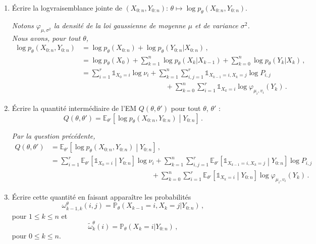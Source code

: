 \documentclass[a4paper,10pt,fleqn]{article}
\newcommand{\1}{\ensuremath{\mathbbm{1}}}
\begin{document}
\begin{enumerate}
\item \'Ecrire la logvraisemblance jointe de $(X_{0:n},Y_{0:n})$: $\theta \mapsto \log p_\theta (X_{0:n},Y_{0:n})$.

\vspace{.2cm}

{\em
Notons $\varphi_{\mu,\sigma^2}$ la densit\'e de la loi gaussienne de moyenne $\mu$ et de variance $\sigma^2$. Nous avons, pour tout $\theta$,
\begin{align*}
\log p_\theta (X_{0:n},Y_{0:n}) &= \log p_\theta (X_{0:n}) + \log p_\theta (Y_{0:n}|X_{0:n})\,,\\
&= \log p_\theta (X_{0}) + \sum_{k=1}^n\log p_\theta (X_{k}|X_{k-1})+ \sum_{k=0}^n\log p_\theta(Y_k|X_k)\,,\\
&= \sum_{i=1}^r\mathds{1}_{X_0=i}\log \nu_i + \sum_{k=1}^n\sum_{i,j=1}^r\mathds{1}_{X_{k-1}=i,X_k=j} \log P_{i,j} \\
&\hspace{5cm}+ \sum_{k=0}^n\sum_{i=1}^r\mathds{1}_{X_k=i}\log \varphi_{\mu_i,v_i}(Y_{k})\,.
\end{align*}
}
\item \'Ecrire la quantit\'e interm\'ediaire de l'EM $Q(\theta,\theta')$ pour tout $\theta$, $\theta'$ :
$$
Q(\theta,\theta') = \mathbb{E}_{\theta'}\left[\log p_\theta (X_{0:n},Y_{0:n})\middle |Y_{0:n}\right]\,.
$$

\vspace{.2cm}

{\em
Par la question pr\'ec\'edente, 
\begin{align*}
Q(\theta,\theta') &= \mathbb{E}_{\theta'}\left[\log p_\theta (X_{0:n},Y_{0:n})\middle |Y_{0:n}\right]\,,\\
&=\sum_{i=1}^r\mathbb{E}_{\theta'}\left[ \mathds{1}_{X_0=i}\middle |Y_{0:n}\right]\log \nu_i +  \sum_{k=1}^n\sum_{i,j=1}^r\mathbb{E}_{\theta'}\left[ \mathds{1}_{X_{k-1}=i,X_k=j}\middle |Y_{0:n}\right] \log P_{i,j} \\
&\hspace{6cm}+ \sum_{k=0}^n\sum_{i=1}^r\mathbb{E}_{\theta'}\left[ \mathds{1}_{X_k=i}\middle |Y_{0:n}\right]\log \varphi_{\mu_i,v_i}(Y_{k})\,.
\end{align*}
}
\item \'Ecrire cette quantit\'e en faisant appara\^itre les probabilit\'es
$$
\omega_{k-1,k}^{\theta}(i,j) = \mathbb{P}_{\theta}\left(X_{k-1}=i,X_k=j|Y_{0:n}\right)\,,
$$
pour $1\leq k \leq n$ et
$$
\tilde \omega_{k}^{\theta}(i) = \mathbb{P}_{\theta}\left(X_k=i|Y_{0:n}\right)\,,
$$
pour $0\leq k \leq n$.


\end{enumerate}
\end{document}
